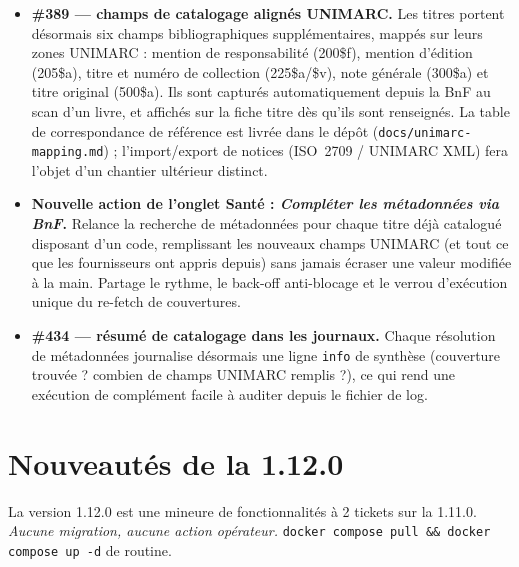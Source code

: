 \begin{itemize}
  \item \textbf{\#389 \string— champs de catalogage alignés
        UNIMARC.} Les titres portent désormais six champs
        bibliographiques supplémentaires, mappés sur leurs zones
        UNIMARC : mention de responsabilité (200\$f), mention
        d'édition (205\$a), titre et numéro de collection
        (225\$a/\$v), note générale (300\$a) et titre original
        (500\$a). Ils sont capturés automatiquement depuis la BnF au
        scan d'un livre, et affichés sur la fiche titre dès qu'ils
        sont renseignés. La table de correspondance de référence est
        livrée dans le dépôt (\texttt{docs/unimarc-mapping.md}) ;
        l'import/export de notices (ISO~2709 / UNIMARC XML) fera
        l'objet d'un chantier ultérieur distinct.
  \item \textbf{Nouvelle action de l'onglet Santé :
        \emph{Compléter les métadonnées via BnF}.} Relance la
        recherche de métadonnées pour chaque titre déjà catalogué
        disposant d'un code, remplissant les nouveaux champs UNIMARC
        (et tout ce que les fournisseurs ont appris depuis) sans
        jamais écraser une valeur modifiée à la main. Partage le
        rythme, le back-off anti-blocage et le verrou d'exécution
        unique du re-fetch de couvertures.
  \item \textbf{\#434 \string— résumé de catalogage dans les
        journaux.} Chaque résolution de métadonnées journalise
        désormais une ligne \texttt{info} de synthèse (couverture
        trouvée ? combien de champs UNIMARC remplis ?), ce qui rend
        une exécution de complément facile à auditer depuis le
        fichier de log.
\end{itemize}

\section{Nouveautés de la 1.12.0}\label{sec:whats-new-1.12.0}

La version 1.12.0 est une mineure de fonctionnalités à 2 tickets sur
la 1.11.0. \emph{Aucune migration, aucune action opérateur.}
\texttt{docker compose pull \&\& docker compose up -d} de routine.

